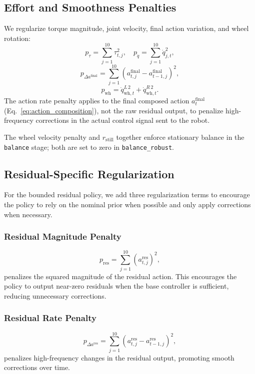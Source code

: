 \documentclass[conference]{IEEEtran}
\begin{document}
\subsection{Effort and Smoothness Penalties}
We regularize torque magnitude, joint velocity, final action variation,
and wheel rotation:
\begin{equation}
p_\tau = \sum_{j=1}^{10} \tau_{t,j}^2,
\quad
p_{\dot{q}} = \sum_{j=1}^{10} \dot{q}_{j,t}^2,
\end{equation}
\begin{equation}
p_{\Delta a^{\mathrm{final}}} = \sum_{j=1}^{10}(a_{t,j}^{\mathrm{final}} - a_{t-1,j}^{\mathrm{final}})^2,
\end{equation}
\begin{equation}
p_{\mathrm{wh}} = \dot{q}_{\mathrm{wh},t}^{L\,2} + \dot{q}_{\mathrm{wh},t}^{R\,2}.
\end{equation}
The action rate penalty applies to the final composed action
$a_t^{\mathrm{final}}$ (Eq.~\eqref{eq:action_composition}), not the
raw residual output, to penalize high-frequency corrections in the
actual control signal sent to the robot.

The wheel velocity penalty and $r_{\mathrm{still}}$ together enforce
stationary balance in the \texttt{balance} stage;
both are set to zero in \texttt{balance\_robust}.

\subsection{Residual-Specific Regularization}
\label{sec:residual_regularization}

For the bounded residual policy, we add three regularization terms
to encourage the policy to rely on the nominal prior when possible
and only apply corrections when necessary.

\subsubsection{Residual Magnitude Penalty}
\begin{equation}
p_{\mathrm{res}} = \sum_{j=1}^{10} (a_{t,j}^{\mathrm{res}})^2,
\end{equation}
penalizes the squared magnitude of the residual action.
This encourages the policy to output near-zero residuals when the
base controller is sufficient, reducing unnecessary corrections.

\subsubsection{Residual Rate Penalty}
\begin{equation}
p_{\Delta a^{\mathrm{res}}} = \sum_{j=1}^{10}(a_{t,j}^{\mathrm{res}} - a_{t-1,j}^{\mathrm{res}})^2,
\end{equation}
penalizes high-frequency changes in the residual output, promoting
smooth corrections over time.
\end{document}
